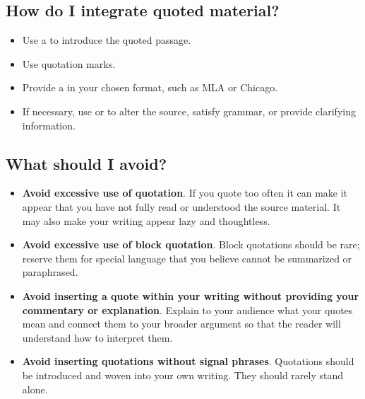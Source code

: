 \subsection{How do I integrate quoted material?}

 \begin{itemize}
\item Use a \hyperlink{signalphrase}{\color{Ahrenge}{signal phrase}} to introduce the quoted passage.

\item Use quotation marks.

\item Provide a \hyperlink{citation}{\color{Ahrenge}{citation}} in your chosen format, such as MLA or Chicago.

\item If necessary, use \hyperlink{ellipsis}{\color{Ahrenge}{ellipsis}} or \hyperlink{brackets}{\color{Ahrenge}{brackets}} to alter the source,
satisfy grammar, or provide clarifying information.

\end{itemize}


\subsection{What should I avoid?}

\begin{itemize}
\item \textbf{Avoid excessive use of quotation}. If you quote too often it can
make it appear that you have not fully read or understood the source material.
It may also make your writing appear lazy and thoughtless.

\item \textbf{Avoid excessive use of block quotation}. Block quotations should
be rare; reserve them for special language that you believe cannot be
summarized or paraphrased. 

\item \textbf{Avoid inserting a quote within your writing without providing
your commentary or explanation}. Explain to your audience what your quotes mean and connect them to your broader argument so that the reader will understand how to interpret them.

\item \textbf{Avoid inserting quotations without signal phrases}. Quotations
should be introduced and woven into your own writing. They should rarely stand alone.

\end{itemize}

